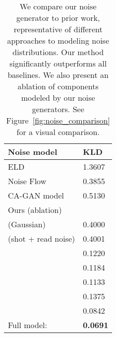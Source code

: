\documentclass[final]{cvpr}
\begin{document}
\begin{table}[thb]
    \centering
    \small
    \newcolumntype{Z}{S[table-format=1.3,table-auto-round]}
	\begin{tabularx}{\linewidth}{X@{\hspace{5mm}}Z}
    \toprule
    Noise model & {KLD}\\
    \midrule
    
    ELD~\cite{wei2020physics}      & 1.3607 \\
    Noise Flow~\cite{abdelhamed2019noise}       & 0.3855 \\ 
    CA-GAN model~\cite{chang2020learning}       & 0.5130 \\ \midrule
    Ours (ablation)\\\midrule
     (Gaussian)                                       & 0.4000 \\
      (shot + read noise)                       & 0.4001 \\
                                          & 0.1220 \\
                     & 0.1184 \\
              & 0.1133 \\
      & 0.1375 \\
     & 0.0842 \\
    \midrule
    Full model:                                              & \bfseries 0.0691 \\
    \bottomrule
    \end{tabularx}
    \vspace{.5mm}
    \caption{We compare our noise generator to prior work, representative of different approaches to modeling noise distributions. Our method significantly outperforms all baselines. We also present an ablation of components modeled by our noise generators. See Figure~\ref{fig:noise_comparison} for a visual comparison.}
    \label{tab:noise_ablation}
    \vspace{-4mm}
\end{table}
\end{document}
